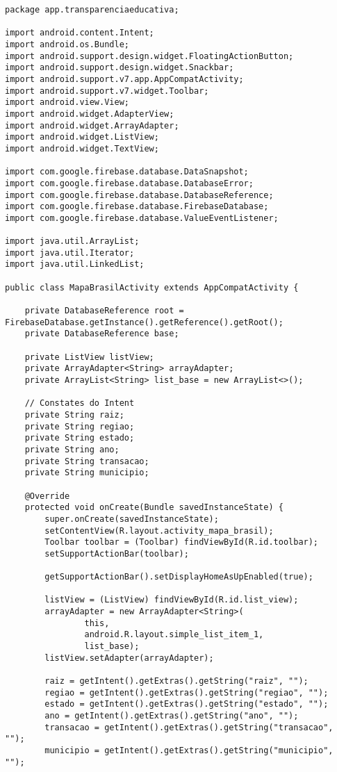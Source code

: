 \documentclass[12pt,a4paper]{article}
\begin{document}
\begin{lstlisting}[caption=./mobile/src/main/java/app/transparenciaeducativa/MapaBrasilActivity.java]
package app.transparenciaeducativa;

import android.content.Intent;
import android.os.Bundle;
import android.support.design.widget.FloatingActionButton;
import android.support.design.widget.Snackbar;
import android.support.v7.app.AppCompatActivity;
import android.support.v7.widget.Toolbar;
import android.view.View;
import android.widget.AdapterView;
import android.widget.ArrayAdapter;
import android.widget.ListView;
import android.widget.TextView;

import com.google.firebase.database.DataSnapshot;
import com.google.firebase.database.DatabaseError;
import com.google.firebase.database.DatabaseReference;
import com.google.firebase.database.FirebaseDatabase;
import com.google.firebase.database.ValueEventListener;

import java.util.ArrayList;
import java.util.Iterator;
import java.util.LinkedList;

public class MapaBrasilActivity extends AppCompatActivity {

    private DatabaseReference root = FirebaseDatabase.getInstance().getReference().getRoot();
    private DatabaseReference base;

    private ListView listView;
    private ArrayAdapter<String> arrayAdapter;
    private ArrayList<String> list_base = new ArrayList<>();

    // Constates do Intent
    private String raiz;
    private String regiao;
    private String estado;
    private String ano;
    private String transacao;
    private String municipio;

    @Override
    protected void onCreate(Bundle savedInstanceState) {
        super.onCreate(savedInstanceState);
        setContentView(R.layout.activity_mapa_brasil);
        Toolbar toolbar = (Toolbar) findViewById(R.id.toolbar);
        setSupportActionBar(toolbar);

        getSupportActionBar().setDisplayHomeAsUpEnabled(true);

        listView = (ListView) findViewById(R.id.list_view);
        arrayAdapter = new ArrayAdapter<String>(
                this,
                android.R.layout.simple_list_item_1,
                list_base);
        listView.setAdapter(arrayAdapter);

        raiz = getIntent().getExtras().getString("raiz", "");
        regiao = getIntent().getExtras().getString("regiao", "");
        estado = getIntent().getExtras().getString("estado", "");
        ano = getIntent().getExtras().getString("ano", "");
        transacao = getIntent().getExtras().getString("transacao", "");
        municipio = getIntent().getExtras().getString("municipio", "");


\end{lstlisting}
\end{document}
